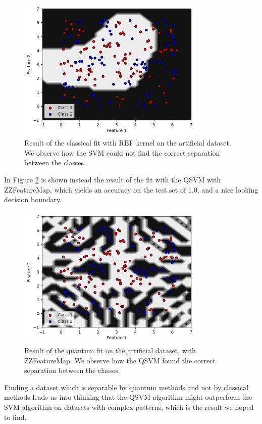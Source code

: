 \documentclass[12pt]{article}
\begin{document}
\begin{figure}[h!]
    \centering
    \includegraphics[width=0.8\textwidth]{images/adhocrbf.png}
    \caption{Result of the classical fit with RBF kernel on the artificial dataset. We observe how the SVM could not find the correct separation between the classes. }
    \label{fig:adhocrbf}
\end{figure}
In Figure \ref{fig:adhoczz} is shown instead the result of the fit with the QSVM with ZZFeatureMap, which yields an accuracy on the test set of 1.0, and a nice looking decision boundary. 
\begin{figure}[h!]
    \centering
    \includegraphics[width=0.8\textwidth]{images/adhoczz.png}
    \caption{Result of the quantum fit on the artificial dataset, with ZZFeatureMap. We observe how the QSVM found the correct separation between the classes.}
    \label{fig:adhoczz}
\end{figure}

Finding a dataset which is separable by quantum methods and not by classical methods leads us into thinking that the QSVM algorithm might outperform the SVM algorithm on datasets with complex patterns, which is the result we hoped to find. 
\end{document}
